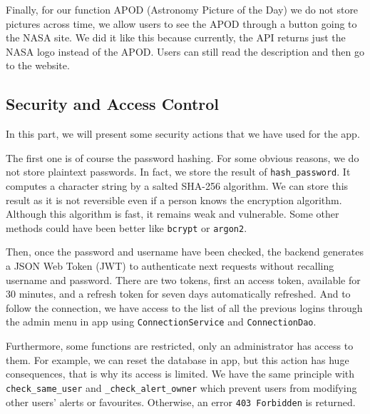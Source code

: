 \bigskip

Finally, for our function APOD (Astronomy Picture of the Day) we do not store pictures across time, we allow users to see the APOD through a button going to the NASA site. We did it like this because currently, the API returns just the NASA logo instead of the APOD. Users can still read the description and then go to the website.

\bigskip
\bigskip

\subsection{Security and Access Control}

\bigskip
\bigskip

In this part, we will present some security actions that we have used for the app.

\bigskip

The first one is of course the password hashing. For some obvious reasons, we do not store plaintext passwords. In fact, we store the result of \texttt{hash\_password}. It computes a character string by a salted SHA-256 algorithm. We can store this result as it is not reversible even if a person knows the encryption algorithm. Although this algorithm is fast, it remains weak and vulnerable. Some other methods could have been better like \texttt{bcrypt} or \texttt{argon2}.

\bigskip

Then, once the password and username have been checked, the backend generates a JSON Web Token (JWT) to authenticate next requests without recalling username and password. There are two tokens, first an access token, available for 30 minutes, and a refresh token for seven days automatically refreshed. And to follow the connection, we have access to the list of all the previous logins through the admin menu in app using \texttt{ConnectionService} and \texttt{ConnectionDao}.

\bigskip

Furthermore, some functions are restricted, only an administrator has access to them. For example, we can reset the database in app, but this action has huge consequences, that is why its access is limited. We have the same principle with \texttt{check\_same\_user} and \texttt{\_check\_alert\_owner} which prevent users from modifying other users' alerts or favourites. Otherwise, an error \texttt{403 Forbidden} is returned.

\bigskip

